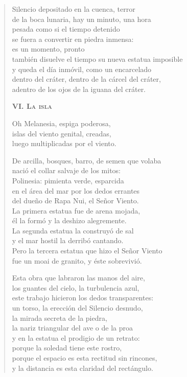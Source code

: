\documentclass[12pt]{article}
\begin{document}
\begin{verse}
Silencio depositado en la cuenca, terror\\
de la boca lunaria, hay un minuto, una hora\\
pesada como si el tiempo detenido\\
se fuera a convertir en piedra inmensa:\\
es un momento, pronto\\
también disuelve el tiempo su nueva estatua imposible\\
y queda el día inmóvil, como un encarcelado\\
dentro del cráter, dentro de la cárcel del cráter,\\
adentro de los ojos de la iguana del cráter.  

{\bfseries\scshape {VI. La isla}}

Oh Melanesia, espiga poderosa,\\
islas del viento genital, creadas,\\
luego multiplicadas por el viento.  

De arcilla, bosques, barro, de semen que volaba\\
nació el collar salvaje de los mitos:\\
Polinesia: pimienta verde, esparcida\\
en el área del mar por los dedos errantes\\
del dueño de Rapa Nui, el Señor Viento.\\
La primera estatua fue de arena mojada,\\
él la formó y la deshizo alegremente.\\
La segunda estatua la construyó de sal\\
y el mar hostil la derribó cantando.\\
Pero la tercera estatua que hizo el Señor Viento\\
fue un moai de granito, y éste sobrevivió.  

Esta obra que labraron las manos del aire,\\
los guantes del cielo, la turbulencia azul,\\
este trabajo hicieron los dedos transparentes:\\
un torso, la erección del Silencio desnudo,\\
la mirada secreta de la piedra,\\
la nariz triangular del ave o de la proa\\
y en la estatua el prodigio de un retrato:\\
porque la soledad tiene este rostro,\\
porque el espacio es esta rectitud sin rincones,\\
y la distancia es esta claridad del rectángulo.  


\end{verse}
\end{document}
